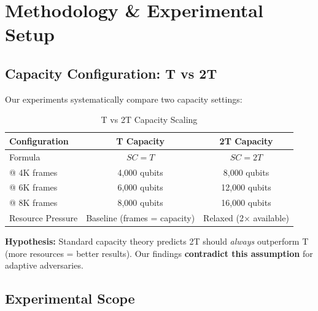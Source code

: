 \documentclass[11pt,a4paper]{article}
\newcommand{\critical}[1]{\textcolor{criticalcolor}{\textbf{#1}}}
\begin{document}
\section{Methodology \& Experimental Setup}

\subsection{Capacity Configuration: T vs 2T}

Our experiments systematically compare two capacity settings:

\vspace{-0.4cm}

\begin{table}[h]
\scriptsize
\centering
\begin{tabular}{lcc}
\toprule
\textbf{Configuration} & \textbf{T Capacity} & \textbf{2T Capacity} \\
\midrule
Formula & $SC = T$ & $SC = 2T$ \\
@ 4K frames & 4,000 qubits & 8,000 qubits \\
@ 6K frames & 6,000 qubits & 12,000 qubits \\
@ 8K frames & 8,000 qubits & 16,000 qubits \\
Resource Pressure & Baseline (frames = capacity) & Relaxed (2× available) \\
\bottomrule
\end{tabular}
\vspace{-0.2cm}
\caption{T vs 2T Capacity Scaling}
\end{table}

\vspace{-0.2cm}

\textbf{Hypothesis:} Standard capacity theory predicts 2T should \textit{always} outperform T (more resources = better results). Our findings \critical{contradict this assumption} for adaptive adversaries.

\subsection{Experimental Scope}
\end{document}
